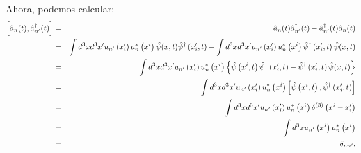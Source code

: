 Ahora, podemos calcular:%
\begin{eqnarray}
\left[ \hat{a}_{n}(t) ,\hat{a}_{n'}^{\dagger }(t) \right] &=&\hat{a}_{n}(t)
\hat{a}_{n'}^{\dagger }(t) -\hat{a}_{n'}^{\dagger }(t) \hat{a}_{n}(t) \notag \\
&=&\int d^{3}xd^{3}x'u_{n'}\left( x'_{i}\right) u_{n}^{\ast }\left( x^{i}\right)
\hat{\psi}(x,t)
\hat{\psi}^{\dagger }\left( x'_{i},t\right) -\int d^{3}xd^{3}x'u_{n'}\left(
x'_{i}\right) u_{n}^{\ast }\left( x^{i}\right) \hat{\psi}^{\dagger }\left(
x'_{i},t\right) \hat{\psi}(x,t) \notag \\
&=&\int d^{3}xd^{3}x'u_{n'}\left( x'_{i}\right) u_{n}^{\ast }\left( x^{i}\right)
\left\{ \hat{\psi}\left(
x^{i},t\right) \hat{\psi}^{\dagger }\left( x'_{i},t\right) -\hat{\psi}^{\dagger
}\left( x'_{i},t\right) \hat{\psi}(x,t) \right\} \notag \\
&=&\int d^{3}xd^{3}x'u_{n'}\left( x'_{i}\right) u_{n}^{\ast }\left( x^{i}\right)
\left[ \hat{\psi}\left(
x^{i},t\right) ,\hat{\psi}^{\dagger }\left( x'_{i},t\right) \right] \notag \\
&=&\int d^{3}xd^{3}x'u_{n'}\left( x'_{i}\right) u_{n}^{\ast }\left( x^{i}\right)
\delta ^{\left( 3\right)
}\left( x^{i}-x'_{i}\right) \notag \\
&=&\int d^{3}xu_{n'}\left( x^{i}\right) u_{n}^{\ast }\left( x^{i}\right) \notag
\\
&=&\delta _{nn'}. \label{RelConmutacion1}
\end{eqnarray}


